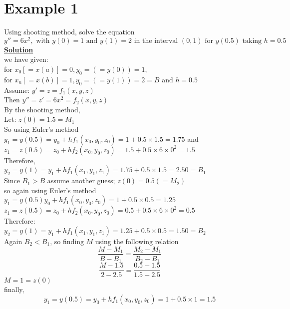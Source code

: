 \documentclass[12pt]{report}
\newcommand{\ubt}[1]{\textbf{\underline{#1}}}
\newcommand{\sps}{\\[0.2cm]}
\newcommand{\NI}{\noindent}
\newcommand{\sprime}{'}
\newcommand{\dprime}{''}
\begin{document}
	\section*{Example 1}
	Using shooting method, solve the equation
	$$
		y\dprime = 6x^2, \text{ with } y(0)=1 \text{ and } y(1) = 2 \text{ in the interval } (0,1) \text{ for } y(0.5) \text{ taking } h=0.5
	$$
	\ubt{Solution}\sps
	we have given:\sps
	for $x_0 [=x(a)] = 0, y_0 = (= y(0)) = 1,$ \sps
	for $x_n [=x(b)] = 1, y_0 = (= y(1)) = 2 = B$ and $h=0.5$\sps
	
	\NI Assume: $y\sprime = z = f_1(x,y,z)$\sps
	Then $y\dprime = z\sprime = 6x^2 = f_2(x,y,z)$\sps
	
	\NI By the shooting method,\sps
	Let: $z(0) = 1.5 = M_1$\sps
	So using Euler's method\sps
	$y_1 = y(0.5) = y_0 + hf_1(x_0,y_0,z_0) = 1 + 0.5 \times 1.5 = 1.75$ and\sps
	$z_1 = z(0.5) = z_0 + hf_2(x_0,y_0, z_0) = 1.5 + 0.5 \times 6 \times 0^2 = 1.5$\sps
	
	\NI Therefore,\sps
	$y_2 = y(1) = y_1 + hf_1(x_1, y_1, z_1) = 1.75 + 0.5 \times 1.5 = 2.50 = B_1$\sps
	
	\NI Since $B_1 > B$ assume another guess; $z(0) = 0.5 (=M_2)$\sps
	so again using Euler's method\sps
	$y_1 = y(0.5) y_0 + hf_1(x_0, y_0, z_0) = 1 + 0.5 \times 0.5 = 1.25$\sps
	$z_1 = z(0.5) = z_0 + hf_2(x_0, y_0, z_0) = 0.5 + 0.5 \times 6 \times 0^2 = 0.5$ \sps
	Therefore:\sps
	$y_2 = y(1) = y_1 + hf_1(x_1, y_1, z_1) = 1.25 + 0.5 \times 0.5 = 1.50 = B_2$\sps
	Again $B_2 < B_1$, so finding $M$ using the following relation
	$$
		\frac{M - M_1}{B - B_1} = \frac{M_2 - M_1}{B_2 - B_1}
	$$
	$$
		\frac{M - 1.5}{2 - 2.5} = \frac{0.5 - 1.5}{1.5 - 2.5}
	$$
	$M = 1 = z(0)$\sps
	finally, 
	$$
		y_1 = y(0.5) = y_0 + hf_1(x_0, y_0, z_0) = 1 + 0.5 \times 1 = 1.5
	$$
	
\end{document}
